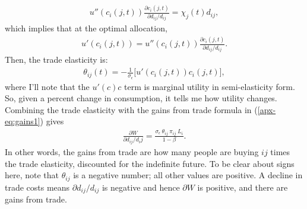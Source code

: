 \documentclass[12pt,pdftex]{article}
\begin{document}
\begin{onehalfspacing}
\begin{align}
\nonumber \\
u''(c_{i}(j,t))\frac{\partial c_{i}(j,t)}{\partial d_{ij} / d_{ij}} = \chi_{j}(t)d_{ij},
\end{align}
which implies that at the optimal allocation,
\begin{align}
u'(c_{i}(j,t) ) =  u''(c_{i}(j,t))\frac{\partial c_{i}(j,t)}{\partial d_{ij} / d_{ij}}. \label{apx-eq:muc-fact}
\end{align}
Then, the trade elasticity is:
\begin{align}
\theta_{ij}(t) =  -\frac{1}{\sigma_{\epsilon}} \bigg [ u'(c_{i}(j,t)) c_{i}(j,t) \bigg],
\end{align}
where I'll note that the $u'(c)c$ term is marginal utility in semi-elasticity form. So, given a percent change in consumption, it tells me how utility changes. Combining the trade elasticity with the gains from trade formula in (\ref{apx-eq:gains1}) gives
\begin{align}
\frac{\partial W}{\partial d_{ij} / d_ij} =  \frac{\sigma_{\epsilon} \ \theta_{ij} \ \pi_{ij} \ L_{i}}{1-\beta}.
\end{align}
In other words, the gains from trade are how many people are buying $ij$ times the trade elasticity, discounted for the indefinite future. To be clear about signs here, note that $\theta_{ij}$ is a negative number; all other values are positive. A decline in trade costs means $\partial d_{ij} / d_{ij}$ is negative and hence $\partial W$ is positive, and there are gains from trade.


\end{onehalfspacing}
\end{document}
